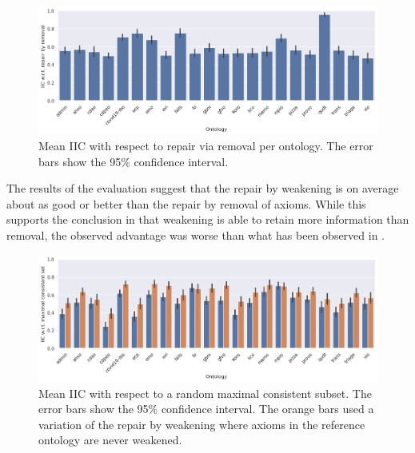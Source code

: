\begin{figure}[ht]
  \centering
  \includegraphics[width=\textwidth]{resources/iic-remove-ontology-bar.png}
  \caption{Mean IIC with respect to repair via removal per ontology. The error bars show the 95\% confidence interval.}
  \label{fig:results-remove}
\end{figure}

The results of the evaluation suggest that the repair by weakening is on average about as good or better than the repair by removal of axioms. While this supports the conclusion in \cite{troquard2018repairing} that weakening is able to retain more information than removal, the observed advantage was worse than what has been observed in \cite{troquard2018repairing}.

\begin{figure}[ht]
  \centering
  \includegraphics[width=\textwidth]{resources/iic-both-mcs-ontology-bar.png}
  \caption{Mean IIC with respect to a random maximal consistent subset. The error bars show the 95\% confidence interval. The orange bars used a variation of the repair by weakening where axioms in the reference ontology are never weakened.}
  \label{fig:results-mcs}
\end{figure}

